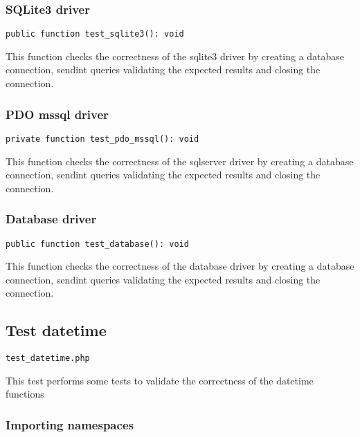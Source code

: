 \documentclass[a4paper]{article}
\begin{document}
\hypertarget{toc126}{}
\subsubsection{SQLite3 driver}

\begin{lstlisting}
public function test_sqlite3(): void
\end{lstlisting}

This function checks the correctness of the sqlite3 driver by creating a
database connection, sendint queries validating the expected results and
closing the connection.

\hypertarget{toc127}{}
\subsubsection{PDO mssql driver}

\begin{lstlisting}
private function test_pdo_mssql(): void
\end{lstlisting}

This function checks the correctness of the sqlserver driver by creating a
database connection, sendint queries validating the expected results and
closing the connection.

\hypertarget{toc128}{}
\subsubsection{Database driver}

\begin{lstlisting}
public function test_database(): void
\end{lstlisting}

This function checks the correctness of the database driver by creating a
database connection, sendint queries validating the expected results and
closing the connection.

\hypertarget{toc129}{}
\subsection{Test datetime}

\begin{lstlisting}
test_datetime.php
\end{lstlisting}

This test performs some tests to validate the correctness
of the datetime functions

\hypertarget{toc130}{}
\subsubsection{Importing namespaces}
\end{document}
